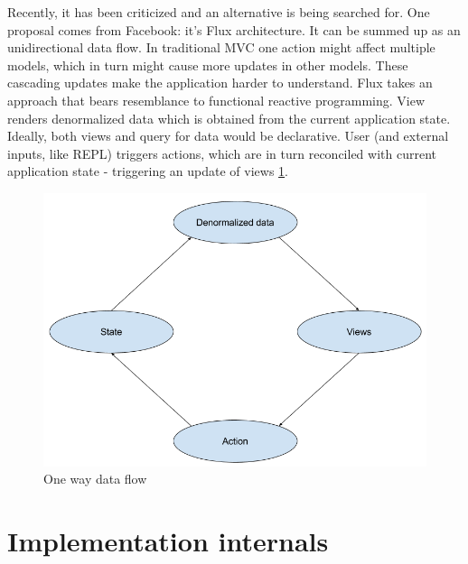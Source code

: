 \documentclass[11pt]{scrartcl}
\begin{document}
Recently, it has been criticized and an alternative is being searched for. One proposal comes from Facebook: it’s Flux architecture. It can be summed up as an unidirectional data flow. In traditional MVC one action might affect multiple models, which in turn might cause more updates in other models. These cascading updates make the application harder to understand. Flux takes an approach that bears resemblance to functional reactive programming. View renders denormalized data which is obtained from the current application state. Ideally, both views and query for data would be declarative. User (and external inputs, like REPL) triggers actions, which are in turn reconciled with current application state - triggering an update of views \ref{oneway}.
\begin{figure}[hbt]
  \includegraphics[scale=0.3]{img/OneWay}
  \caption{One way data flow}
  \label{oneway}
\end{figure}

\section{Implementation internals}
\end{document}
